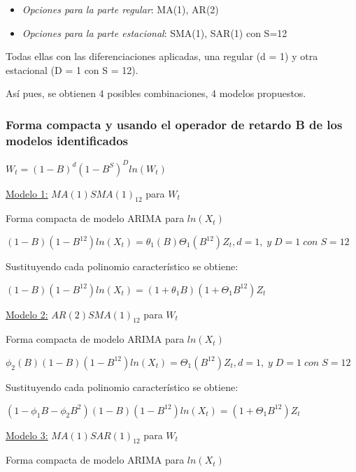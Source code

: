 \documentclass[
]{article}
\begin{document}
\begin{itemize}
\item
  \emph{Opciones para la parte regular}: MA(1), AR(2)
\item
  \emph{Opciones para la parte estacional}: SMA(1), SAR(1) con S=12
\end{itemize}

Todas ellas con las diferenciaciones aplicadas, una regular (d = 1) y
otra estacional (D = 1 con S = 12).

Así pues, se obtienen 4 posibles combinaciones, 4 modelos propuestos.

\pagebreak

\hypertarget{forma-compacta-y-usando-el-operador-de-retardo-b-de-los-modelos-identificados}{%
\subsubsection{Forma compacta y usando el operador de retardo B de los
modelos
identificados}\label{forma-compacta-y-usando-el-operador-de-retardo-b-de-los-modelos-identificados}}

\(W_t = (1-B)^d(1-B^S)^D ln(W_t)\)

\medskip

\underline{Modelo 1:} \(MA(1)SMA(1)_{12}\) para \(W_t\)

Forma compacta de modelo ARIMA para \(ln(X_t)\)

\((1-B)(1-B^{12}) ln(X_t) = \theta_1(B)\Theta_1(B^{12})Z_t, d = 1,\; y \; D = 1 \; con \; S = 12\)

Sustituyendo cada polinomio característico se obtiene:

\((1-B)(1-B^{12}) ln(X_t) = (1+\theta_1B)(1+\Theta_1B^{12})Z_t\)

\medskip

\underline{Modelo 2:} \(AR(2)SMA(1)_{12}\) para \(W_t\)

Forma compacta de modelo ARIMA para \(ln(X_t)\)

\(\phi_2(B) (1-B)(1-B^{12}) ln(X_t) = \Theta_1(B^{12})Z_t, d = 1,\; y \; D = 1 \; con \; S = 12\)

Sustituyendo cada polinomio característico se obtiene:

\((1-\phi_1B-\phi_2B^2)(1-B)(1-B^{12}) ln(X_t) = (1+\Theta_1B^{12})Z_t\)

\medskip

\underline{Modelo 3:} \(MA(1)SAR(1)_{12}\) para \(W_t\)

Forma compacta de modelo ARIMA para \(ln(X_t)\)
\end{document}
